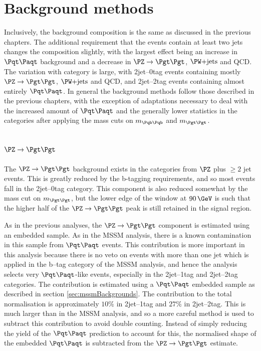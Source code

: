 \section{Background methods}
\label{sec:Hhhbackgrounds}

Inclusively, the background composition is the same as discussed in the previous
chapters. The additional requirement that the events contain at least two jets
changes the composition slightly, with the largest effect being an increase in
$\ttbar$ background and a decrease in $\ZToTauTau$, $\WJets$ and QCD. The
variation with category is large, with 2jet--0tag events containing mostly
$\ZToTauTau$, $\WJets$ and QCD, and 2jet--2tag events containing almost entirely
$\ttbar$. In general the background methods follow those described in the
previous chapters, with the exception of adaptations necessary to deal with the
increased amount of $\ttbar$ and the generally lower statistics in the
categories after applying the mass cuts on $m_{\Pqb\Pqb}$ and $m_{\Pgt\Pgt}$.

\subsection{$\ZToTauTau$}

The $\ZToTauTau$ background exists in the categories from $\PZ$ plus $\geq 2$
jet events. This is greatly reduced by the b-tagging requirements, and so most
events fall in the 2jet--0tag category. This component is also reduced somewhat
by the mass cut on $m_{\Pgt\Pgt}$, but the lower edge of the window at $90\,\GeV$
is such that the higher half of the $\ZToTauTau$ peak is still retained in the
signal region.  

As in the previous analyses, the $\ZToTauTau$ component is estimated using an
embedded sample. As in the \ac{MSSM} analysis, there is a known contamination in
this sample from $\ttbar$ events. This contribution is more important in this
analysis because there is no veto on events with more than one jet which
is applied in the b--tag category of the \ac{MSSM} analysis, and 
hence the analysis selects very $\ttbar$-like events,
especially in the 2jet--1tag and 2jet--2tag categories. The contribution is
estimated using a $\ttbar$ embedded sample as described in section
\ref{sec:mssmBackgrounds}. The contribution to the total normalisation is
approximately $10\%$ in 2jet--1tag and $27\%$ in 2jet--2tag. This is much larger
than in the \ac{MSSM} analysis, and so a more careful method is used to subtract
this contribution to avoid double counting. Instead of simply reducing the yield
of the $\ttbar$ prediction to account for this, the normalised shape of the
embedded $\ttbar$ is subtracted from the $\ZToTauTau$ estimate.

